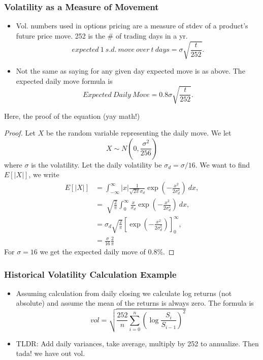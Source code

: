 \documentclass{article}
\begin{document}
\subsubsection{Volatility as a Measure of Movement}
\begin{itemize}
    \item Vol. numbers used in options pricing are a measure of stdev of a
    product's future price move. 252 is the \# of trading days in a yr.
    \begin{equation*}
        expected \ 1 \ s.d. \ move \ over \ t \ days = \sigma \sqrt{\frac{t}{252}}.
    \end{equation*}
    \item Not the same as saying for any given day expected move is as above.
    The expected daily move formula is
    \begin{equation*}
        Expected \ Daily \ Move = 0.8\sigma \sqrt{\frac{t}{252}}.
    \end{equation*}
\end{itemize}

Here, the proof of the equation (yay math!)
\begin{proof}
    Let $X$ be the random variable representing the daily move. We let 
    \begin{equation*}
        X \sim N\left(0, \frac{\sigma^2}{256}\right)
    \end{equation*}
    where $\sigma$ is the volatility. Let the daily volatility be
    $\sigma_d = \sigma / 16$. We want to find $E[|X|]$, we write
    \begin{align*}
        E[|X|] &= \int_{-\infty}^\infty |x| \frac{1}{\sqrt{2\pi}\sigma_d}\exp\left(-\frac{x^2}{2\sigma_d^2}\right) \ dx, \\
        &= \sqrt[]{\frac{2}{\pi}}\int_0^\infty \frac{x}{\sigma_d}\exp\left(-\frac{x^2}{2\sigma_d^2}\right) \ dx, \\
        &= \sigma_d\sqrt{\frac{2}{\pi}}\left[\exp\left(-\frac{x^2}{2\sigma_d^2}\right)\right]^\infty_0, \\
        &= \frac{\sigma}{16}\frac{2}{\pi}
    \end{align*}
    For $\sigma = 16$ we get the expected daily move of 0.8\%.
\end{proof}

\subsubsection{Historical Volatility Calculation Example}
\begin{itemize}
    \item Assuming calculation from daily closing we calculate log returns (not
    absolute) and assume the mean of the returns is always zero. The formula is 
    \begin{equation*}
        vol = \sqrt{\frac{252}{n}\sum_{i=0}^n\left(\log\frac{S_i}{S_{i-1}}\right)^2}
    \end{equation*}
    \item TLDR: Add daily variances, take average, multiply by 252 to annualize.
    Then tada! we have out vol.
\end{itemize}
\end{document}
